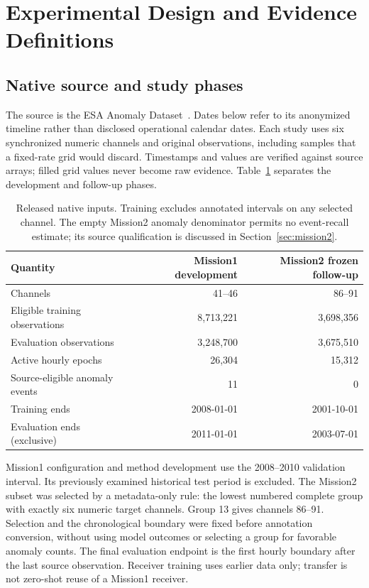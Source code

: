 \section{Experimental Design and Evidence Definitions}
\label{sec:protocol}
\subsection{Native source and study phases}
The source is the ESA Anomaly Dataset~\citep{esa2025dataset,kotowski2026esa}.
Dates below refer to its anonymized timeline rather than disclosed operational
calendar dates. Each study uses six synchronized numeric channels and original
observations, including samples that a fixed-rate grid would discard. Timestamps
and values are verified against source arrays; filled grid values never become
raw evidence. Table~\ref{tab:study-data} separates the development and follow-up
phases.

\begin{table}[htbp]
\centering\small
\begin{tabular}{lrr}
\toprule
Quantity & Mission1 development & Mission2 frozen follow-up \\
\midrule
Channels & 41--46 & 86--91 \\
Eligible training observations & 8,713,221 & 3,698,356 \\
Evaluation observations & 3,248,700 & 3,675,510 \\
Active hourly epochs & 26,304 & 15,312 \\
Source-eligible anomaly events & 11 & 0 \\
Training ends & 2008-01-01 & 2001-10-01 \\
Evaluation ends (exclusive) & 2011-01-01 & 2003-07-01 \\
\bottomrule
\end{tabular}
\caption{Released native inputs. Training excludes annotated intervals on any
selected channel. The empty Mission2 anomaly denominator permits no event-recall
estimate; its source qualification is discussed in Section~\ref{sec:mission2}.}
\label{tab:study-data}
\end{table}

Mission1 configuration and method development use the 2008--2010 validation
interval. Its previously examined historical test period is excluded. The Mission2
subset was selected by a metadata-only rule: the lowest numbered complete group
with exactly six numeric target channels. Group 13 gives channels 86--91. Selection
and the chronological boundary were fixed before annotation conversion, without
using model outcomes or selecting a group for favorable anomaly counts.
The final evaluation endpoint is the first hourly boundary after the last source
observation. Receiver training uses earlier data only; transfer is not zero-shot
reuse of a Mission1 receiver.

